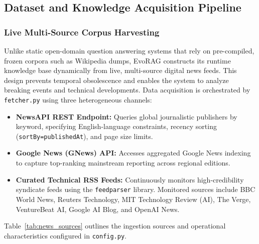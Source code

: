 \subsection{Dataset and Knowledge Acquisition Pipeline}
\label{subsec:data_acquisition}

\subsubsection{Live Multi-Source Corpus Harvesting}
Unlike static open-domain question answering systems that rely on pre-compiled, frozen corpora such as Wikipedia dumps, EvoRAG constructs its runtime knowledge base dynamically from live, multi-source digital news feeds. This design prevents temporal obsolescence and enables the system to analyze breaking events and technical developments. Data acquisition is orchestrated by \texttt{fetcher.py} using three heterogeneous channels:
\begin{itemize}
    \item \textbf{NewsAPI REST Endpoint:} Queries global journalistic publishers by keyword, specifying English-language constraints, recency sorting (\texttt{sortBy=publishedAt}), and page size limits.
    \item \textbf{Google News (GNews) API:} Accesses aggregated Google News indexing to capture top-ranking mainstream reporting across regional editions.
    \item \textbf{Curated Technical RSS Feeds:} Continuously monitors high-credibility syndicate feeds using the \texttt{feedparser} library. Monitored sources include BBC World News, Reuters Technology, MIT Technology Review (AI), The Verge, VentureBeat AI, Google AI Blog, and OpenAI News.
\end{itemize}

Table~\ref{tab:news_sources} outlines the ingestion sources and operational characteristics configured in \texttt{config.py}.

